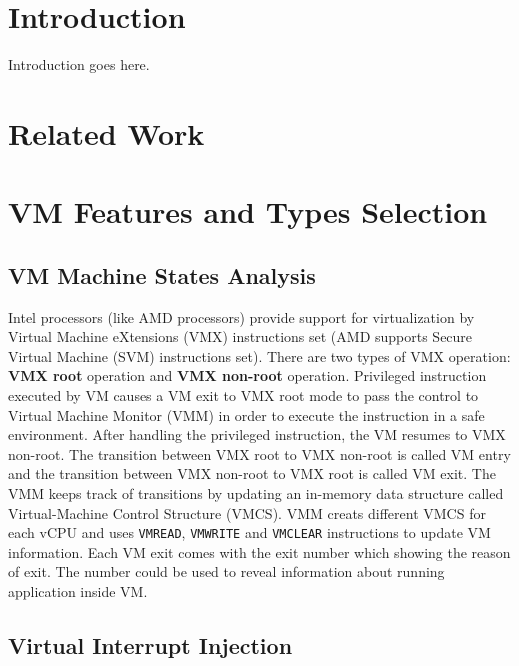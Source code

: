 \documentclass[10pt, conference, compsocconf]{IEEEtran}
\begin{document}
\section{Introduction}

Introduction goes here. 

\section{Related Work}





\section{VM Features and Types Selection}

\subsection{VM Machine States Analysis}

Intel processors (like AMD processors) provide support for virtualization by Virtual Machine eXtensions (VMX) instructions set (AMD
supports Secure Virtual Machine (SVM) instructions set). There are two types of VMX operation: \textbf{VMX root} operation and \textbf{VMX non-root} operation.  Privileged instruction executed by VM causes a VM exit to VMX root mode to pass the control to Virtual Machine Monitor (VMM) in order to execute the instruction in a safe environment.  After handling the privileged instruction, the VM resumes to VMX non-root. The transition between VMX root to VMX non-root is called VM entry and the transition between VMX non-root to VMX root is called VM exit.  The VMM keeps track of transitions by updating an in-memory data structure called Virtual-Machine Control Structure (VMCS). VMM creats different VMCS for each vCPU and uses \texttt{VMREAD}, \texttt{VMWRITE} and \texttt{VMCLEAR} instructions to update VM information. Each VM exit comes with the exit number which showing the reason of exit. The number could be used to reveal information about running application inside VM. 

\subsection{Virtual Interrupt Injection}
\end{document}
